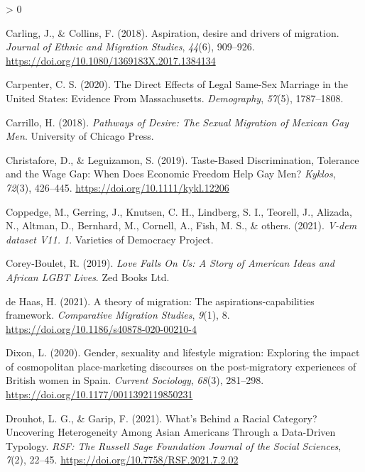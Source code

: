 \documentclass[
  11pt,
]{article}
\newlength{\cslhangindent}
\newenvironment{CSLReferences}[2] %
 {%
  \setlength{\parindent}{0pt}
  \ifodd #1 \everypar{\setlength{\hangindent}{\cslhangindent}}\ignorespaces\fi
  \ifnum #2 > 0
  \setlength{\parskip}{#2\baselineskip}
  \fi
 }%
 {}
\begin{document}
\begin{CSLReferences}{1}{0}
\leavevmode\hypertarget{ref-carling_2018_aspiration}{}%
Carling, J., \& Collins, F. (2018). Aspiration, desire and drivers of migration. \emph{Journal of Ethnic and Migration Studies}, \emph{44}(6), 909--926. \url{https://doi.org/10.1080/1369183X.2017.1384134}

\leavevmode\hypertarget{ref-carpenter_2020}{}%
Carpenter, C. S. (2020). The {Direct Effects} of {Legal Same}-{Sex Marriage} in the {United States}: {Evidence From Massachusetts}. \emph{Demography}, \emph{57}(5), 1787--1808.

\leavevmode\hypertarget{ref-carrillo_2018}{}%
Carrillo, H. (2018). \emph{Pathways of {Desire}: {The Sexual Migration} of {Mexican Gay Men}}. {University of Chicago Press}.

\leavevmode\hypertarget{ref-christafore_2019}{}%
Christafore, D., \& Leguizamon, S. (2019). Taste-{Based Discrimination}, {Tolerance} and the {Wage Gap}: {When Does Economic Freedom Help Gay Men}? \emph{Kyklos}, \emph{72}(3), 426--445. \url{https://doi.org/10.1111/kykl.12206}

\leavevmode\hypertarget{ref-coppedge_2021}{}%
Coppedge, M., Gerring, J., Knutsen, C. H., Lindberg, S. I., Teorell, J., Alizada, N., Altman, D., Bernhard, M., Cornell, A., Fish, M. S., \& others. (2021). \emph{V-dem dataset V11. 1}. {Varieties of Democracy Project}.

\leavevmode\hypertarget{ref-corey-boulet_2019}{}%
Corey-Boulet, R. (2019). \emph{Love {Falls On Us}: {A Story} of {American Ideas} and {African LGBT Lives}}. {Zed Books Ltd.}

\leavevmode\hypertarget{ref-dehaas_2021}{}%
de Haas, H. (2021). A theory of migration: The aspirations-capabilities framework. \emph{Comparative Migration Studies}, \emph{9}(1), 8. \url{https://doi.org/10.1186/s40878-020-00210-4}

\leavevmode\hypertarget{ref-dixon_2020}{}%
Dixon, L. (2020). Gender, sexuality and lifestyle migration: {Exploring} the impact of cosmopolitan place-marketing discourses on the post-migratory experiences of {British} women in {Spain}. \emph{Current Sociology}, \emph{68}(3), 281--298. \url{https://doi.org/10.1177/0011392119850231}

\leavevmode\hypertarget{ref-drouhot_2021_what}{}%
Drouhot, L. G., \& Garip, F. (2021). What's {Behind} a {Racial Category}? {Uncovering Heterogeneity Among Asian Americans Through} a {Data}-{Driven Typology}. \emph{RSF: The Russell Sage Foundation Journal of the Social Sciences}, \emph{7}(2), 22--45. \url{https://doi.org/10.7758/RSF.2021.7.2.02}


\end{CSLReferences}
\end{document}
